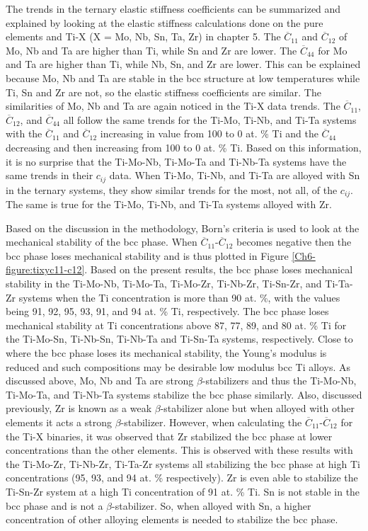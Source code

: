 The trends in the ternary elastic stiffness coefficients can be summarized and explained by looking at the elastic stiffness calculations done on the pure elements and Ti-X (X = Mo, Nb, Sn, Ta, Zr) in chapter 5. The $\overline{C}_{11}$ and $\overline{C}_{12}$ of Mo, Nb and Ta are higher than Ti, while Sn and Zr are lower. The $\overline{C}_{44}$ for Mo and Ta are higher than Ti, while Nb, Sn, and Zr are lower. This can be explained because Mo, Nb and Ta are stable in the bcc structure at low temperatures while Ti, Sn and Zr are not, so the elastic stiffness coefficients are similar. The similarities of Mo, Nb and Ta are again noticed in the Ti-X data trends. The $\overline{C}_{11}$, $\overline{C}_{12}$, and $\overline{C}_{44}$ all follow the same trends for the Ti-Mo, Ti-Nb, and Ti-Ta systems with the $\overline{C}_{11}$ and $\overline{C}_{12}$ increasing in value from 100 to 0 at. \% Ti and the $\overline{C}_{44}$ decreasing and then increasing from 100 to 0 at. \% Ti. Based on this information, it is no surprise that the Ti-Mo-Nb, Ti-Mo-Ta and Ti-Nb-Ta systems have the same trends in their $c_{ij}$ data. When Ti-Mo, Ti-Nb, and Ti-Ta are alloyed with Sn in the ternary systems, they show similar trends for the most, not all, of the $c_{ij}$. The same is true for the Ti-Mo, Ti-Nb, and Ti-Ta systems alloyed with Zr.

Based on the discussion in the methodology, Born's criteria is used to look at the mechanical stability of the bcc phase. When $\overline{C}_{11}$-$\overline{C}_{12}$ becomes negative then the bcc phase loses mechanical stability and is thus plotted in Figure \ref{Ch6-figure:tixyc11-c12}. Based on the present results, the bcc phase loses mechanical stability in the Ti-Mo-Nb, Ti-Mo-Ta, Ti-Mo-Zr, Ti-Nb-Zr, Ti-Sn-Zr, and Ti-Ta-Zr systems when the Ti concentration is more than 90 at. \%, with the values being 91, 92, 95, 93, 91, and 94 at. \% Ti, respectively. The bcc phase loses mechanical stability at Ti concentrations above 87, 77, 89, and 80 at. \% Ti for the Ti-Mo-Sn, Ti-Nb-Sn, Ti-Nb-Ta and Ti-Sn-Ta systems, respectively. Close to where the bcc phase loses its mechanical stability, the Young's modulus is reduced and such compositions may be desirable low modulus bcc Ti alloys. As discussed above, Mo, Nb and Ta are strong $\beta$-stabilizers and thus the Ti-Mo-Nb, Ti-Mo-Ta, and Ti-Nb-Ta systems stabilize the bcc phase similarly. Also, discussed previously, Zr is known as a weak $\beta$-stabilizer alone but when alloyed with other elements it acts a strong $\beta$-stabilizer. However, when calculating the $\overline{C}_{11}$-$\overline{C}_{12}$ for the Ti-X binaries, it was observed that Zr stabilized the bcc phase at lower concentrations than the other elements. This is observed with these results with the Ti-Mo-Zr, Ti-Nb-Zr, Ti-Ta-Zr systems all stabilizing the bcc phase at high Ti concentrations (95, 93, and 94 at. \% respectively). Zr is even able to stabilize the Ti-Sn-Zr system at a high Ti concentration of 91 at. \% Ti. Sn is not stable in the bcc phase and is not a $\beta$-stabilizer. So, when alloyed with Sn, a higher concentration of other alloying elements is needed to stabilize the bcc phase. 

